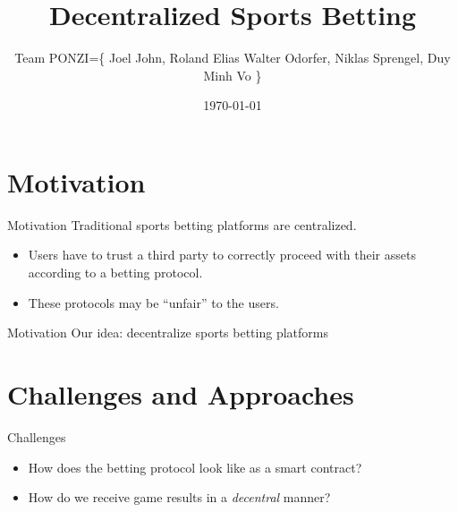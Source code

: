\documentclass[aspectratio=169]{beamer}
\title{Decentralized Sports Betting}
\date{\today}
\author{Team PONZI=\{ Joel John,
Roland Elias Walter Odorfer,
Niklas Sprengel,
Duy Minh Vo \}}
\institute{Blockchain Technologies}
\begin{document}
  \maketitle
  \section{Motivation}
  \begin{frame}{Motivation}
    Traditional sports betting platforms are centralized.
    \begin{itemize}
      \item Users have to trust a third party to correctly proceed with their assets according to a betting protocol.
      \item These protocols may be ``unfair'' to the users.
    \end{itemize}
  \end{frame}

  \begin{frame}{Motivation}
    Our idea: decentralize sports betting platforms
  \end{frame}

  \section{Challenges and Approaches}
  \begin{frame}{Challenges}
    \begin{itemize}
      \item How does the betting protocol look like as a smart contract?
      \item How do we receive game results in a \emph{decentral} manner?
    \end{itemize}
  \end{frame}

\end{document}
